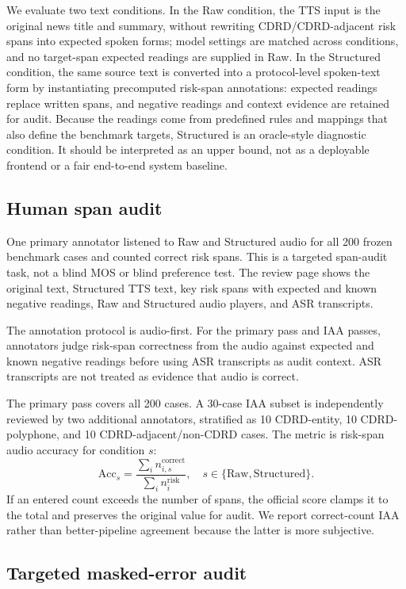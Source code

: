 \documentclass{article}
\begin{document}
We evaluate two text conditions. In the Raw condition, the TTS input is the original news title and summary, without rewriting CDRD/CDRD-adjacent risk spans into expected spoken forms; model settings are matched across conditions, and no target-span expected readings are supplied in Raw. In the Structured condition, the same source text is converted into a protocol-level spoken-text form by instantiating precomputed risk-span annotations: expected readings replace written spans, and negative readings and context evidence are retained for audit. Because the readings come from predefined rules and mappings that also define the benchmark targets, Structured is an oracle-style diagnostic condition. It should be interpreted as an upper bound, not as a deployable frontend or a fair end-to-end system baseline.

\subsection{Human span audit}

One primary annotator listened to Raw and Structured audio for all 200 frozen benchmark cases and counted correct risk spans. This is a targeted span-audit task, not a blind MOS or blind preference test. The review page shows the original text, Structured TTS text, key risk spans with expected and known negative readings, Raw and Structured audio players, and ASR transcripts.

The annotation protocol is audio-first. For the primary pass and IAA passes, annotators judge risk-span correctness from the audio against expected and known negative readings before using ASR transcripts as audit context. ASR transcripts are not treated as evidence that audio is correct.

The primary pass covers all 200 cases. A 30-case IAA subset is independently reviewed by two additional annotators, stratified as 10 CDRD-entity, 10 CDRD-polyphone, and 10 CDRD-adjacent/non-CDRD cases. The metric is risk-span audio accuracy for condition $s$:
\[
\mathrm{Acc}_{s} =
\frac{\sum_i n^{\mathrm{correct}}_{i,s}}
{\sum_i n^{\mathrm{risk}}_{i}},
\quad s \in \{\mathrm{Raw}, \mathrm{Structured}\}.
\]
If an entered count exceeds the number of spans, the official score clamps it to the total and preserves the original value for audit. We report correct-count IAA rather than better-pipeline agreement because the latter is more subjective.

\subsection{Targeted masked-error audit}
\end{document}
